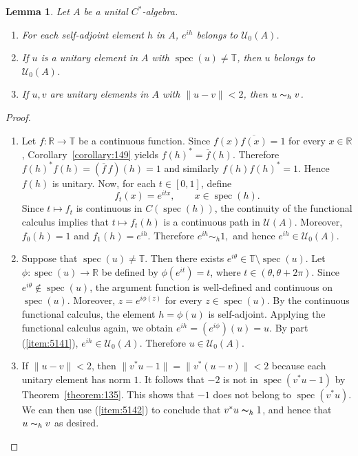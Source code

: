 \documentclass{book}
\newtheorem{lemma}[definition]{Lemma}
\def\cstar{\(C^*\)-algebra}
\begin{document}
\begin{lemma}\label{lemma:514}\label{lemma:Matthes214}
  Let \(A\) be a unital \cstar.
  \begin{enumerate}
    \item\label{item:5141} For each self-adjoint element \(h\) in \(A\), \(e^{ih}\) belongs to \(\mathcal{U}_0(A)\).
    \item\label{item:5142} If \(u\) is a unitary element in \(A\) with \(\operatorname{spec}(u)\neq\mathbb{T}\), then \(u\) belongs to \(\mathcal{U}_0(A)\).
    \item If \(u,v\) are unitary elements in \(A\) with \(\|u-v\|<2\), then \(u\thicksim_h v\).
  \end{enumerate}
\end{lemma}
\begin{proof}
  \begin{enumerate}
    \item Let \(f:\mathbb R\to\mathbb T\) be a continuous function. Since
      \(
      f(x)\overline{f(x)}=1
      \)
      for every \(x\in\mathbb R\), Corollary~\ref{corollary:149} yields
      \(
      {f(h)}^*
      =
      \overline f(h).
      \)
      Therefore
      \(
      {f(h)}^*f(h)
      =
      (\overline f\,f)(h)
      =
      1
      \)
      and similarly
      \(
      f(h){f(h)}^*
      =
      1.
      \)
      Hence \(f(h)\) is unitary.
      Now, for each \(t\in[0,1]\), define
      \[
      f_t(x)=e^{itx},
      \qquad x\in \operatorname{spec}(h).
      \]
      Since \(t\mapsto f_t\) is continuous in \(C(\operatorname{spec}(h))\), the continuity of the functional calculus implies that
      \(
      t\mapsto f_t(h)
      \)
      is a continuous path in \(\mathcal{U}(A)\). Moreover,
      \(
      f_0(h)=1
      \)
      and
      \(
      f_1(h)=e^{ih}.
      \)
      Therefore
      \(
      e^{ih}\sim_h 1,
      \)
      and hence
      \(
      e^{ih}\in\mathcal U_0(A).
      \)
    \item Suppose that \(\operatorname{spec}(u)\neq\mathbb T\). Then there exists
      \(e^{i\theta}\in\mathbb T\setminus \operatorname{spec}(u)\). Let
      \(\phi:\operatorname{spec}(u)\rightarrow\mathbb R\) be defined by
      \(\phi(e^{it})=t\), where \(t\in(\theta,\theta+2\pi)\).
      Since \(e^{i\theta}\notin \operatorname{spec}(u)\), the argument function is
      well-defined and continuous on \(\operatorname{spec}(u)\). Moreover,
      \(z=e^{i\phi(z)}\) for every \(z\in \operatorname{spec}(u)\). By the continuous
      functional calculus, the element \(h=\phi(u)\) is self-adjoint.
      Applying the functional calculus again, we obtain
      \(e^{ih}=(e^{i\phi})(u)=u\). By part (\ref{item:5141}), \(e^{ih}\in\mathcal U_0(A)\).
      Therefore \(u\in\mathcal U_0(A)\).
    \item If \(\|u-v\|<2\), then \(\|v^*u-1\|=\|v^*(u-v)\|<2\) because 
      each unitary element has norm \(1\). It follows that \(-2\) is not in 
      \(\operatorname{spec}(v^*u-1)\) by Theorem~\ref{theorem:135}. This shows that \(-1\) does not belong to \(\operatorname{spec}(v^*u)\).
      We can then use (\ref{item:5142}) to conclude that \(v^*u\thicksim_h 1\),
      and hence that \(u\thicksim_h v\) as desired.
  \end{enumerate}
\end{proof}
\end{document}
